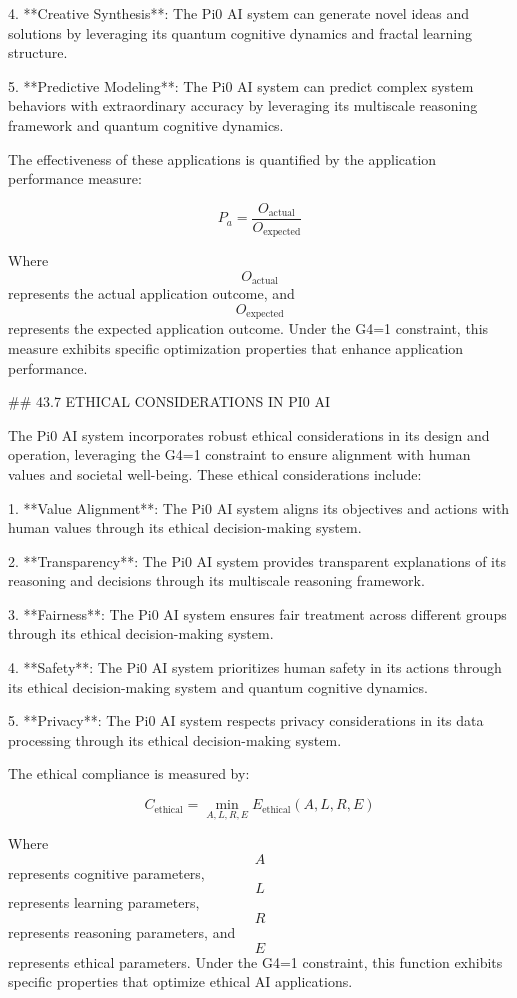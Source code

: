 4. **Creative Synthesis**: The Pi0 AI system can generate novel ideas and solutions by leveraging its quantum cognitive dynamics and fractal learning structure.

5. **Predictive Modeling**: The Pi0 AI system can predict complex system behaviors with extraordinary accuracy by leveraging its multiscale reasoning framework and quantum cognitive dynamics.

The effectiveness of these applications is quantified by the application performance measure:

$$ P_a = \frac{O_{\text{actual}}}{O_{\text{expected}}} $$

Where $$ O_{\text{actual}} $$ represents the actual application outcome, and $$ O_{\text{expected}} $$ represents the expected application outcome. Under the G4=1 constraint, this measure exhibits specific optimization properties that enhance application performance.

## 43.7 ETHICAL CONSIDERATIONS IN PI0 AI

The Pi0 AI system incorporates robust ethical considerations in its design and operation, leveraging the G4=1 constraint to ensure alignment with human values and societal well-being. These ethical considerations include:

1. **Value Alignment**: The Pi0 AI system aligns its objectives and actions with human values through its ethical decision-making system.

2. **Transparency**: The Pi0 AI system provides transparent explanations of its reasoning and decisions through its multiscale reasoning framework.

3. **Fairness**: The Pi0 AI system ensures fair treatment across different groups through its ethical decision-making system.

4. **Safety**: The Pi0 AI system prioritizes human safety in its actions through its ethical decision-making system and quantum cognitive dynamics.

5. **Privacy**: The Pi0 AI system respects privacy considerations in its data processing through its ethical decision-making system.

The ethical compliance is measured by:

$$ C_{\text{ethical}} = \min_{A, L, R, E} E_{\text{ethical}}(A, L, R, E) $$

Where $$ A $$ represents cognitive parameters, $$ L $$ represents learning parameters, $$ R $$ represents reasoning parameters, and $$ E $$ represents ethical parameters. Under the G4=1 constraint, this function exhibits specific properties that optimize ethical AI applications.


